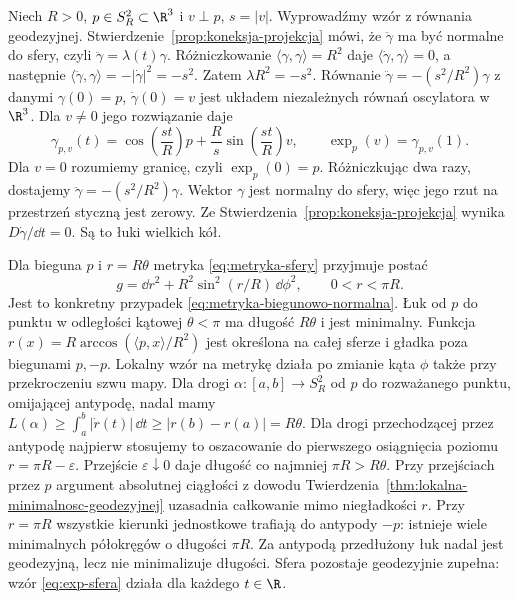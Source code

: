\begin{przyklad}
\label{prz:geodezyjne-sfera}
Niech $R>0$, $p\in S_R^2\subset\R^3$ i $v\perp p$,
$s=|v|$. Wyprowadźmy wzór z równania geodezyjnej.
Stwierdzenie~\ref{prop:koneksja-projekcja} mówi, że
$\ddot\gamma$ ma być normalne do sfery, czyli
$\ddot\gamma=\lambda(t)\gamma$.
Różniczkowanie $\langle\gamma,\gamma\rangle=R^2$
daje $\langle\dot\gamma,\gamma\rangle=0$, a następnie
$\langle\ddot\gamma,\gamma\rangle=-|\dot\gamma|^2=-s^2$.
Zatem $\lambda R^2=-s^2$.
Równanie $\ddot\gamma=-(s^2/R^2)\gamma$ z danymi
$\gamma(0)=p$, $\dot\gamma(0)=v$ jest układem
niezależnych równań oscylatora w $\R^3$.
Dla $v\ne0$ jego rozwiązanie daje
\begin{equation}\label{eq:exp-sfera}
 \gamma_{p,v}(t)
 =\cos\!\left(\frac{st}{R}\right)p
  +\frac{R}{s}\sin\!\left(\frac{st}{R}\right)v,
 \qquad \exp_p(v)=\gamma_{p,v}(1).
\end{equation}
Dla $v=0$ rozumiemy granicę, czyli $\exp_p(0)=p$.
Różniczkując dwa razy, dostajemy
$\ddot\gamma=-(s^2/R^2)\gamma$.
Wektor $\gamma$ jest normalny do sfery,
więc jego rzut na przestrzeń styczną jest zerowy.
Ze Stwierdzenia~\ref{prop:koneksja-projekcja} wynika
$D\dot\gamma/\dd t=0$. Są to łuki wielkich kół.

Dla bieguna $p$ i $r=R\theta$ metryka
\eqref{eq:metryka-sfery} przyjmuje postać
\[
 g=\dd r^2+R^2\sin^2(r/R)\,\dd\phi^2,
 \qquad 0<r<\pi R.
\]
Jest to konkretny przypadek
\eqref{eq:metryka-biegunowo-normalna}.
Łuk od $p$ do punktu w odległości kątowej
$\theta<\pi$ ma długość $R\theta$ i jest
minimalny. Funkcja
$r(x)=R\arccos(\langle p,x\rangle/R^2)$
jest określona na całej sferze i gładka
poza biegunami $p,-p$. Lokalny wzór na metrykę
działa po zmianie kąta $\phi$ także przy
przekroczeniu szwu mapy. Dla drogi
$\alpha:[a,b]\to S_R^2$ od $p$ do rozważanego punktu,
omijającej antypodę, nadal mamy
$L(\alpha)\geq\int_a^b|\dot r(t)|\,\dd t
\geq|r(b)-r(a)|=R\theta$.
Dla drogi przechodzącej przez antypodę najpierw stosujemy
to oszacowanie do pierwszego osiągnięcia poziomu
$r=\pi R-\varepsilon$. Przejście $\varepsilon\downarrow0$
daje długość co najmniej $\pi R>R\theta$.
Przy przejściach przez $p$ argument absolutnej ciągłości
z dowodu Twierdzenia~\ref{thm:lokalna-minimalnosc-geodezyjnej}
uzasadnia całkowanie mimo niegładkości $r$.
Przy $r=\pi R$ wszystkie kierunki jednostkowe
trafiają do antypody $-p$: istnieje wiele
minimalnych półokręgów o długości $\pi R$.
Za antypodą przedłużony łuk nadal jest
geodezyjną, lecz nie minimalizuje długości.
Sfera pozostaje geodezyjnie zupełna: wzór
\eqref{eq:exp-sfera} działa dla każdego $t\in\R$.
\end{przyklad}

